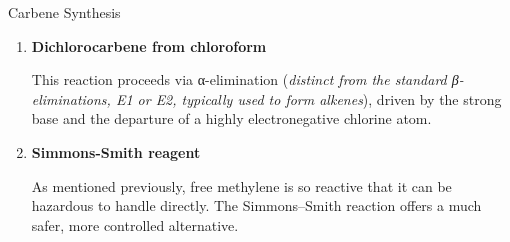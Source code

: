 \documentclass[10pt]{article}
\begin{document}
\begin{core}[label=core:carbene_synthesis]{Carbene Synthesis}
\begin{enumerate}
          Note that this reaction is essentially \textbf{irreversible}: the exceptional stability of the resulting  drives the reaction forward, cleanly liberating highly reactive methylene.

          \item \textbf{Dichlorocarbene from chloroform}


          This reaction proceeds via α-elimination (\textit{distinct from the standard β-eliminations, E1 or E2, typically used to form alkenes}), driven by the strong base  and the departure of a highly electronegative chlorine atom.

          \item \textbf{Simmons-Smith reagent}

          As mentioned previously, free methylene is so reactive that it can be hazardous to handle directly. The Simmons--Smith reaction offers a much safer, more controlled alternative.


\end{enumerate}
\end{core}
\end{document}
